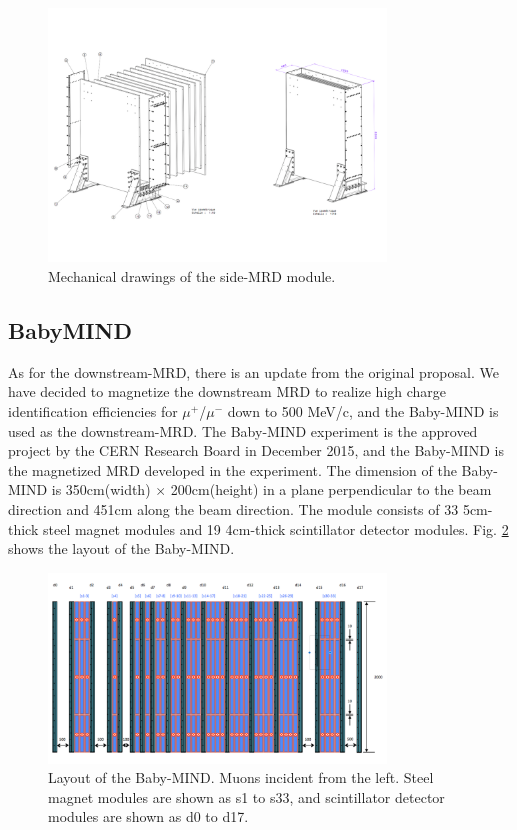 \begin{figure}%
  \begin{center}
  \includegraphics[width=0.8\textwidth]{figs/mec_drawing_side_mrd.pdf}
  \caption{Mechanical drawings of the side-MRD module.}
  \label{fig:med_drawing_side_mrd}
  \end{center}
\end{figure}


\subsection{BabyMIND}
As for the downstream-MRD, there is an update from the original proposal.
We have decided to magnetize the downstream MRD to realize high charge identification efficiencies for $\mu^{+}$/$\mu^{-}$ down to 500 MeV/c,
and the Baby-MIND\cite{BabyMIND} is used as the downstream-MRD.
The Baby-MIND experiment is the approved project by the CERN Research Board in December 2015,
and the Baby-MIND is the magnetized MRD developed in the experiment.
The dimension of the Baby-MIND is 350cm(width) $\times$ 200cm(height) 
in a plane perpendicular to the beam direction and 451cm along the beam direction.
The module consists of 33 5cm-thick steel magnet modules and 19 4cm-thick scintillator detector modules.
Fig. \ref{fig:baby_mind_layout} shows the layout of the Baby-MIND.


\begin{figure}%
  \begin{center}
  \includegraphics[width=0.8\textwidth]{figs/baby_mind_layout.pdf}
  \caption{Layout of the Baby-MIND. Muons incident from the left. 
  Steel magnet modules are shown as s1 to s33, and scintillator detector modules are shown as d0 to d17.}
  \label{fig:baby_mind_layout}
  \end{center}
\end{figure}


